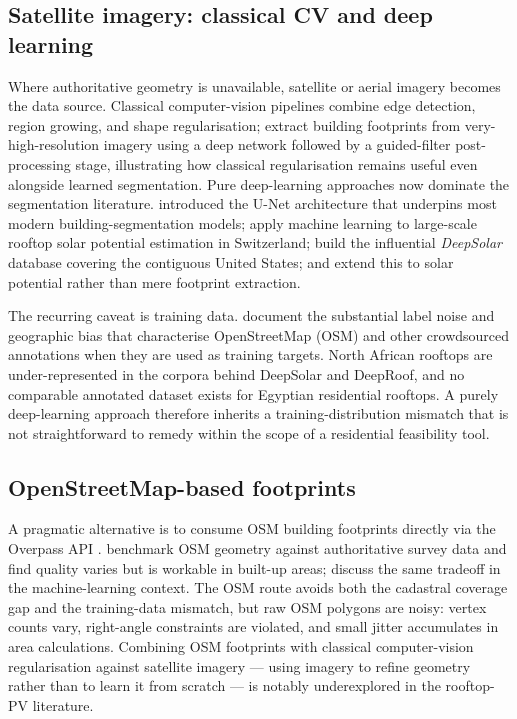 \subsection{Satellite imagery: classical CV and deep learning}
\label{sec:lit-roof-cv}

Where authoritative geometry is unavailable, satellite or aerial
imagery becomes the data source. Classical computer-vision pipelines
combine edge detection, region growing, and shape regularisation;
\citet{wang2018} extract building footprints from very-high-resolution
imagery using a deep network followed by a guided-filter
post-processing stage, illustrating how classical regularisation
remains useful even alongside learned segmentation. Pure
deep-learning approaches now dominate the segmentation literature.
\citet{ronneberger2015} introduced the U-Net architecture that
underpins most modern building-segmentation models;
\citet{assouline2017} apply machine learning to large-scale rooftop
solar potential estimation in Switzerland; \citet{yu2018deepsolar}
build the influential \emph{DeepSolar} database covering the
contiguous United States; and \citet{lee2019deeproof} extend this to
solar potential rather than mere footprint extraction.

The recurring caveat is training data. \citet{vargas-munoz2021}
document the substantial label noise and geographic bias that
characterise OpenStreetMap (OSM) and other crowdsourced annotations
when they are used as training targets. North African rooftops are
under-represented in the corpora behind DeepSolar and DeepRoof, and
no comparable annotated dataset exists for Egyptian residential
rooftops. A purely deep-learning approach therefore inherits a
training-distribution mismatch that is not straightforward to remedy
within the scope of a residential feasibility tool.

\subsection{OpenStreetMap-based footprints}
\label{sec:lit-roof-osm}

A pragmatic alternative is to consume OSM building footprints
directly via the Overpass API \citep{osm-overpass}. \citet{osm-quality}
benchmark OSM geometry against authoritative survey data and find
quality varies but is workable in built-up areas; \citet{vargas-munoz2021}
discuss the same tradeoff in the machine-learning context. The OSM
route avoids both the cadastral coverage gap and the training-data
mismatch, but raw OSM polygons are noisy: vertex counts vary,
right-angle constraints are violated, and small jitter accumulates in
area calculations. Combining OSM footprints with classical
computer-vision regularisation against satellite imagery --- using
imagery to refine geometry rather than to learn it from scratch --- is
notably underexplored in the rooftop-PV literature.

